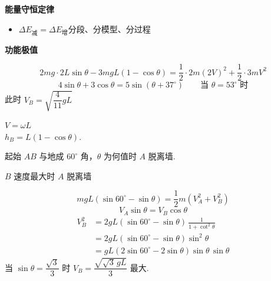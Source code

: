 \textbf{能量守恒定律}
\begin{itemize}
\item $\Delta E_{\text{减}}=\Delta E_{\text{增}}$\quad 分段、分模型、分过程
\end{itemize}
\textbf{功能极值}

\begin{problem}[1、]
\begin{solution}
\[
2mg\cdot 2L\sin\theta-3mgL(1-\cos\theta)=\frac{1}{2}\cdot 2m(2V)^{2}+\frac{1}{2}\cdot 3mV^{2}
\]
\[
4\sin\theta+3\cos\theta=5\sin(\theta+37^\circ)\qquad \text{当 }\theta=53^\circ\text{ 时}
\]
此时 $V_B=\sqrt{\dfrac{4}{11}gL}$

\medskip
$V=\omega L$ %
\\
$h_B=L(1-\cos\theta)$.
\end{solution}
\end{problem}
\begin{problem}[2、]
起始 $AB$ 与地成 $60^\circ$ 角，$\theta$ 为何值时 $A$ 脱离墙.

$B$ 速度最大时 $A$ 脱离墙
\begin{solution}
\[
mgL(\sin60^\circ-\sin\theta)=\frac{1}{2}m(V_A^{2}+V_B^{2})
\]
\[
V_A\sin\theta=V_B\cos\theta
\]
\begin{align*}
V_B^{2}&=2gL(\sin60^\circ-\sin\theta)\,\frac{1}{1+\cot^{2}\theta}\\
&=2gL(\sin60^\circ-\sin\theta)\sin^{2}\theta\\
&=gL(2\sin60^\circ-2\sin\theta)\sin\theta\,\sin\theta
\end{align*}
当 $\sin\theta=\dfrac{\sqrt{3}}{3}$ 时 $V_B=\dfrac{\sqrt{\sqrt{3}\,gL}}{3}$ 最大.
\end{solution}
\end{problem}
